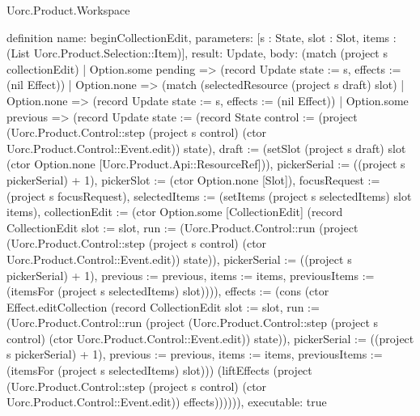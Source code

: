 \begin{lexlean}{Uorc.Product.Workspace}
\begin{semanticmodule}
definition{
  name: beginCollectionEdit,
  parameters: [s : State, slot : Slot, items : (List Uorc.Product.Selection::Item)],
  result: Update,
  body: (match (project s collectionEdit)
    | Option.some pending => (record Update {state := s, effects := (nil Effect)})
    | Option.none => (match (selectedResource (project s draft) slot)
      | Option.none => (record Update {state := s, effects := (nil Effect)})
      | Option.some previous => (record Update {state := (record State {control := (project (Uorc.Product.Control::step (project s control) (ctor Uorc.Product.Control::Event.edit)) state), draft := (setSlot (project s draft) slot (ctor Option.none [Uorc.Product.Api::ResourceRef])), pickerSerial := ((project s pickerSerial) + 1), pickerSlot := (ctor Option.none [Slot]), focusRequest := (project s focusRequest), selectedItems := (setItems (project s selectedItems) slot items), collectionEdit := (ctor Option.some [CollectionEdit] (record CollectionEdit {slot := slot, run := (Uorc.Product.Control::run (project (Uorc.Product.Control::step (project s control) (ctor Uorc.Product.Control::Event.edit)) state)), pickerSerial := ((project s pickerSerial) + 1), previous := previous, items := items, previousItems := (itemsFor (project s selectedItems) slot)}))}), effects := (cons (ctor Effect.editCollection (record CollectionEdit {slot := slot, run := (Uorc.Product.Control::run (project (Uorc.Product.Control::step (project s control) (ctor Uorc.Product.Control::Event.edit)) state)), pickerSerial := ((project s pickerSerial) + 1), previous := previous, items := items, previousItems := (itemsFor (project s selectedItems) slot)})) (liftEffects (project (Uorc.Product.Control::step (project s control) (ctor Uorc.Product.Control::Event.edit)) effects)))}))),
  executable: true
}


\end{semanticmodule}
\end{lexlean}
